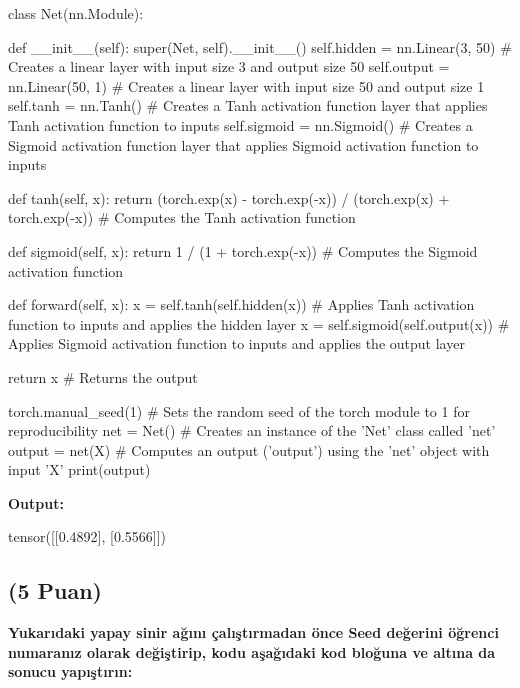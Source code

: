 \documentclass[11pt]{article}
\begin{document}
\begin{python}

class Net(nn.Module):

    def __init__(self):
        super(Net, self).__init__()
        self.hidden = nn.Linear(3, 50)  # Creates a linear layer with input size 3 and output size 50
        self.output = nn.Linear(50, 1)  # Creates a linear layer with input size 50 and output size 1
        self.tanh = nn.Tanh()  # Creates a Tanh activation function layer that applies Tanh activation function to inputs
        self.sigmoid = nn.Sigmoid()  # Creates a Sigmoid activation function layer that applies Sigmoid activation function to inputs

    def tanh(self, x):
        return (torch.exp(x) - torch.exp(-x)) / (torch.exp(x) + torch.exp(-x))  # Computes the Tanh activation function

    def sigmoid(self, x):
        return 1 / (1 + torch.exp(-x))  # Computes the Sigmoid activation function

    def forward(self, x):
        x = self.tanh(self.hidden(x))  # Applies Tanh activation function to inputs and applies the hidden layer
        x = self.sigmoid(self.output(x))  # Applies Sigmoid activation function to inputs and applies the output layer

        return x  # Returns the output

torch.manual_seed(1)  # Sets the random seed of the torch module to 1 for reproducibility
net = Net()  # Creates an instance of the 'Net' class called 'net'
output = net(X)  # Computes an output ('output') using the 'net' object with input 'X'
print(output)  

\end{python}

\textbf{Output:} 

tensor([[0.4892],
        [0.5566]])

\subsection{(5 Puan)} \textbf{Yukarıdaki yapay sinir ağını çalıştırmadan önce Seed değerini öğrenci numaranız olarak değiştirip, kodu aşağıdaki kod bloğuna ve altına da sonucu yapıştırın:}
\end{document}
